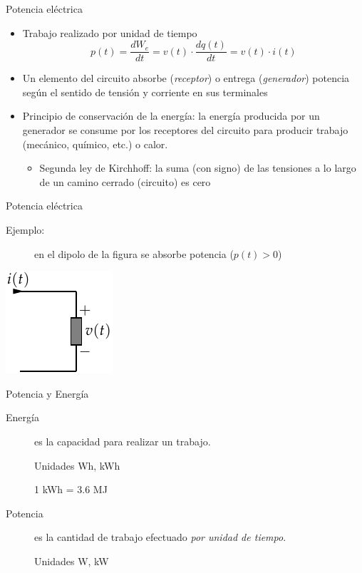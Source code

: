 \documentclass[xcolor={usenames,svgnames,dvipsnames}]{beamer}
\begin{document}
\begin{frame}[label={sec:org0a071b0}]{Potencia eléctrica}
\begin{itemize}
\item Trabajo realizado por unidad de tiempo
$$p(t)=\frac{dW_{e}}{dt}=v(t)\cdot\frac{dq(t)}{dt}=v(t)\cdot i(t)$$

\item Un elemento del circuito absorbe (\emph{receptor}) o entrega (\emph{generador})
potencia según el sentido de tensión y corriente en sus terminales

\item \alert{Principio de conservación de la energía}: la energía producida por
un generador se consume por los receptores del circuito para producir
trabajo (mecánico, químico, etc.) o calor.

\begin{itemize}
\item Segunda ley de Kirchhoff: la suma (con signo) de las tensiones a
lo largo de un camino cerrado (circuito) es cero
\end{itemize}
\end{itemize}
\end{frame}

\begin{frame}[label={sec:org797c6e6}]{Potencia eléctrica}
\begin{description}
\item[{Ejemplo:}] en el dipolo de la figura se absorbe potencia (\(p(t)>0\))
\end{description}
\begin{center}
\includegraphics[height=0.5\textheight]{../figs/ReceptorPasivo.pdf}
\end{center}
\end{frame}

\begin{frame}[label={sec:orgb25a21b}]{Potencia y Energía}
\begin{description}
\item[{Energía}] es la capacidad para realizar un trabajo.

Unidades Wh, kWh

1 kWh = 3.6 MJ

\item[{Potencia}] es la cantidad de trabajo efectuado \emph{por unidad de
tiempo}.

Unidades W, kW
\end{description}
\end{frame}
\end{document}
